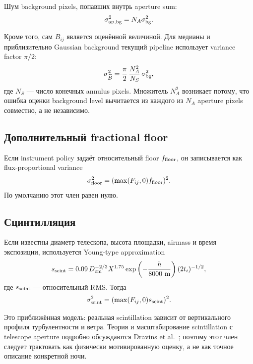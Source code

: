 Шум background pixels, попавших внутрь aperture sum:
\begin{equation}
  \sigma^2_{\rm ap,bg}=N_A\sigma^2_{\rm bg}.
\end{equation}

Кроме того, сам $B_{ij}$ является оценённой величиной. Для медианы и приблизительно Gaussian background текущий pipeline использует variance factor $\pi/2$:
\begin{equation}
  \sigma^2_{\widehat B}
  =\frac{\pi}{2}\,\frac{N_A^2}{N_S}\,\sigma^2_{\rm bg},
\end{equation}
где $N_S$ --- число конечных annulus pixels. Множитель $N_A^2$ возникает потому, что ошибка оценки background level вычитается из каждого из $N_A$ aperture pixels совместно, а не независимо.

\subsection{Дополнительный fractional floor}

Если instrument policy задаёт относительный floor $f_{\rm floor}$, он записывается как flux-proportional variance
\begin{equation}
  \sigma^2_{\rm floor}=(\max(F_{ij},0)f_{\rm floor})^2.
\end{equation}
По умолчанию этот член равен нулю.

\subsection{Сцинтилляция}

Если известны диаметр телескопа, высота площадки, airmass и время экспозиции, используется Young-type approximation
\begin{equation}
  s_{\rm scint}
  =0.09\,D_{\rm cm}^{-2/3}X^{1.75}
  \exp\left(-\frac{h}{8000\ \mathrm{m}}\right)
  (2t_i)^{-1/2},
  \label{eq:scintillation}
\end{equation}
где $s_{\rm scint}$ --- относительный RMS. Тогда
\begin{equation}
  \sigma^2_{\rm scint}=(\max(F_{ij},0)s_{\rm scint})^2.
\end{equation}

Это приближённая модель: реальная scintillation зависит от вертикального профиля турбулентности и ветра. Теория и масштабирование scintillation с telescope aperture подробно обсуждаются Dravins et al.~\cite{dravins1998}; поэтому этот член следует трактовать как физически мотивированную оценку, а не как точное описание конкретной ночи.


